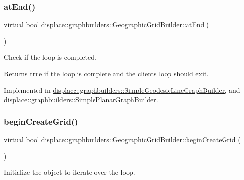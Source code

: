 \subsubsection{\texorpdfstring{atEnd()}{atEnd()}}
{\footnotesize\ttfamily virtual bool displace\+::graphbuilders\+::\+Geographic\+Grid\+Builder\+::at\+End (\begin{DoxyParamCaption}{ }\end{DoxyParamCaption})\hspace{0.3cm}{\ttfamily [pure virtual]}}



Check if the loop is completed. 

\begin{DoxyReturn}{Returns}
true if the loop is complete and the client\textquotesingle{}s loop should exit. 
\end{DoxyReturn}


Implemented in \mbox{\hyperlink{classdisplace_1_1graphbuilders_1_1_simple_geodesic_line_graph_builder_ae78f3efefaef598263c297686ecd7465}{displace\+::graphbuilders\+::\+Simple\+Geodesic\+Line\+Graph\+Builder}}, and \mbox{\hyperlink{classdisplace_1_1graphbuilders_1_1_simple_planar_graph_builder_abaaebf466b639c6a98777596f3fdc31f}{displace\+::graphbuilders\+::\+Simple\+Planar\+Graph\+Builder}}.

\mbox{\label{classdisplace_1_1graphbuilders_1_1_geographic_grid_builder_ac929320efe7bd7c38064250651263999}} 
\subsubsection{\texorpdfstring{beginCreateGrid()}{beginCreateGrid()}}
{\footnotesize\ttfamily virtual bool displace\+::graphbuilders\+::\+Geographic\+Grid\+Builder\+::begin\+Create\+Grid (\begin{DoxyParamCaption}{ }\end{DoxyParamCaption})\hspace{0.3cm}{\ttfamily [pure virtual]}}



Initialize the object to iterate over the loop. 



